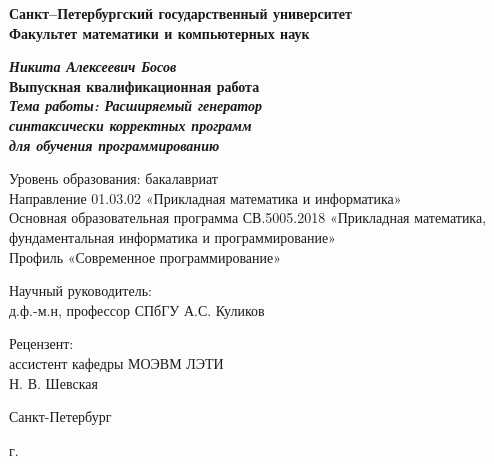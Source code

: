 \begin{titlepage}
\begin{center}

\textbf{Санкт--Петербургский государственный университет}\\
\textbf{Факультет математики и компьютерных наук}


\vspace{35mm}

\textbf{\textit{\large Никита Алексеевич Босов}} \\[8mm]
\textbf{\large Выпускная квалификационная работа}\\[3mm]
\textbf{\textit{\large Тема работы:  Расширяемый генератор\\синтаксически корректных программ\\для обучения программированию}}

\vspace{20mm}
Уровень образования: бакалавриат\\
Направление 01.03.02 «Прикладная математика и информатика»\\
Основная образовательная программа СВ.5005.2018
«Прикладная математика, фундаментальная информатика и программирование»\\
Профиль «Современное программирование»\\[25mm]


\begin{flushright}
\begin{minipage}[t]{0.65\textwidth}
{Научный руководитель:} \\
д.ф.-м.н, профессор СПбГУ А.С. Куликов
\vspace{10mm}

{Рецензент:} \\
ассистент кафедры МОЭВМ ЛЭТИ \\Н. В. Шевская
\end{minipage}
\end{flushright}

\vfill

{Санкт-Петербург}
\par{\the\year{} г.}
\end{center}
\end{titlepage}
\restoregeometry
\addtocounter{page}{1}
